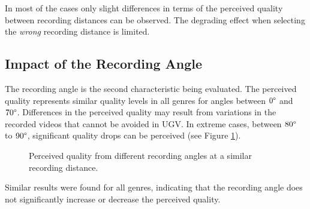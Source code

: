In most of the cases only slight differences in terms of the perceived quality between recording distances can be observed.
The degrading effect when selecting the \emph{wrong} recording distance is limited. 
\subsection{Impact of the Recording Angle}
The recording angle is the second characteristic being evaluated. 
The perceived quality represents similar quality levels in all genres for angles between $0\degree$ and $70\degree$. 
Differences in the perceived quality may result from variations in the recorded videos that cannot be avoided in \ac{UGV}.
In extreme cases, between $80\degree$ to $90\degree$, significant quality drops can be perceived (see Figure \ref{fig:440_Angle_Sports}). 
\begin{figure}[htb]
\centering
{}
\caption[Perceived quality from different recording angles]{Perceived quality from different recording angles at a similar recording distance.}
\label{fig:440_Angle_Sports}
\end{figure}
 Similar results were found for all genres, indicating that the recording angle does not significantly increase or decrease the perceived quality.
